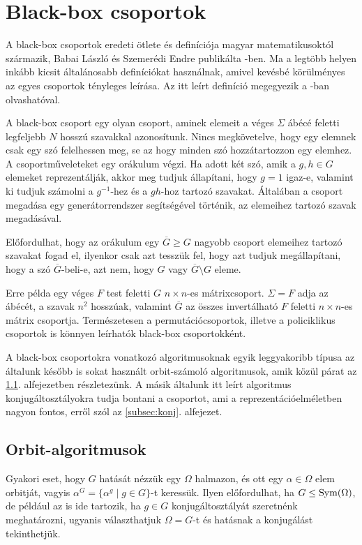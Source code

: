 \section{Black-box csoportok}
\label{sec:blackbox}
A black-box csoportok eredeti ötlete és definíciója magyar matematikusoktól származik,
Babai László és Szemerédi Endre publikálta \cite{BS84}-ben.
Ma a legtöbb helyen inkább kicsit általánosabb definíciókat használnak, amivel kevésbé körülményes az
egyes csoportok tényleges leírása. Az itt leírt definíció megegyezik a \cite{Ser03}-ban olvashatóval.

A black-box csoport egy olyan csoport,
aminek elemeit a véges $\Sigma$ ábécé feletti legfeljebb $N$ hosszú szavakkal azonosítunk.
Nincs megkövetelve, hogy egy elemnek csak egy szó felelhessen meg, se az hogy minden szó hozzátartozzon
egy elemhez.
A csoportműveleteket egy orákulum végzi.
Ha adott két szó, amik a $g, h\in G$ elemeket reprezentálják,
akkor meg tudjuk állapítani, hogy $g=1$ igaz-e,
valamint ki tudjuk számolni a $g^{-1}$-hez és a $gh$-hoz tartozó szavakat.
Általában a csoport megadása egy generátorrendszer segítségével történik, az elemeihez tartozó szavak megadásával.

Előfordulhat, hogy az orákulum egy $\overline{G} \ge G$ nagyobb csoport elemeihez tartozó szavakat fogad el,
ilyenkor csak azt tesszük fel, hogy azt tudjuk megállapítani, hogy a szó $\overline{G}$-beli-e,
azt nem, hogy $G$ vagy $\overline{G}\setminus G$ eleme.

Erre példa egy véges $F$ test feletti $G$ $n\times n$-es mátrixcsoport.
$\Sigma=F$ adja az ábécét, a szavak $n^2$ hosszúak,
valamint $\overline{G}$ az összes invertálható $F$ feletti $n\times n$-es mátrix csoportja.
Természetesen a permutációcsoportok, illetve a policiklikus csoportok is könnyen leírhatók black-box csoportokként.

A black-box csoportokra vonatkozó algoritmusoknak  egyik leggyakoribb típusa az általunk később is sokat használt
orbit-számoló algoritmusok, amik közül párat az \ref{subsec:orbit}. alfejezetben részletezünk.
A másik általunk itt leírt algoritmus konjugáltosztályokra tudja bontani a csoportot, ami a reprezentációelméletben nagyon fontos,
erről szól az \ref{subsec:konj}. alfejezet.

\subsection{Orbit-algoritmusok}
\label{subsec:orbit}
Gyakori eset, hogy $G$ hatását nézzük egy $\Omega$ halmazon, és ott egy $\alpha\in\Omega$ elem orbitját,
vagyis $\alpha^G = \{ \alpha^g \mid g \in G \}$-t keressük. Ilyen előfordulhat, ha $G \le \operatorname{Sym}(\Omega)$,
de például az is ide tartozik, ha $g \in G$ konjugáltosztályát szeretnénk meghatározni, ugyanis választhatjuk
$\Omega=G$-t és hatásnak a konjugálást tekinthetjük.

